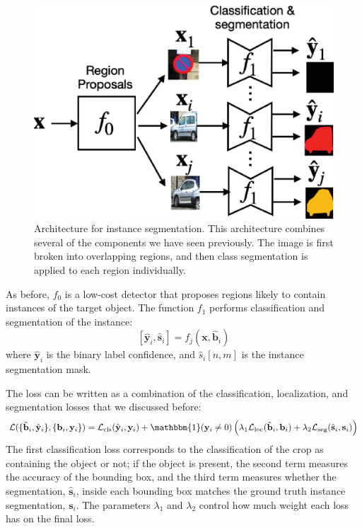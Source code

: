 \begin{figure}
    \centerline{
        \includegraphics[width=0.5\linewidth]{figures/object_recognition/instance_segmentation_architecture.eps}
    }
    \caption{Architecture for instance segmentation. This architecture combines several of the components we have seen previously. The image is first broken into overlapping regions, and then class segmentation is applied to each region individually.}
    \label{fig:instance_segmentation_architecture}
\end{figure}
As before, $f_0$ is a low-cost detector that proposes regions likely to contain instances of the target object. The function $f_1$ performs classification and segmentation of the instance:
\begin{equation}
    \left[\hat{\mathbf{y}}_i,   \hat{\mathbf{s}}_i \right]= f_j(\mathbf{x}, \hat{\mathbf{b}}_i)
\end{equation}
where $\hat{\mathbf{y}}_i$ is the binary label confidence, and $\hat{s}_i \left[ n,m \right]$ is the instance segmentation mask.

The loss can be written as a combination of the classification, localization, and segmentation losses that we discussed before:
\begin{equation}
    \mathcal{L}( \{\hat{\mathbf{b}}_i, \hat{\mathbf{y}}_i\}, \{\mathbf{b}_i, \mathbf{y}_i\})
    =  \mathcal{L}_{\text{cls}}(\hat{\mathbf{y}}_i, \mathbf{y}_i) +
    \mathbbm{1} (\mathbf{y}_i \neq 0)
    \left(
    \lambda_1 \mathcal{L}_{\text{loc}} (\hat{\mathbf{b}}_i, \mathbf{b}_i)
    +
    \lambda_2 \mathcal{L}_{\text{seg}} (\hat{\mathbf{s}}_i, \mathbf{s}_i)
    \right)
\end{equation}
The first classification loss corresponds to the classification of the crop as containing the object or not; if the object is present, the second term measures the accuracy of the bounding box, and the third term measures whether the segmentation, $\hat{\mathbf{s}}_i$,  inside each bounding box matches the ground truth instance segmentation, $\mathbf{s}_i$. The parameters $\lambda_1$ and $\lambda_2$ control how much weight each loss has on the final loss.

